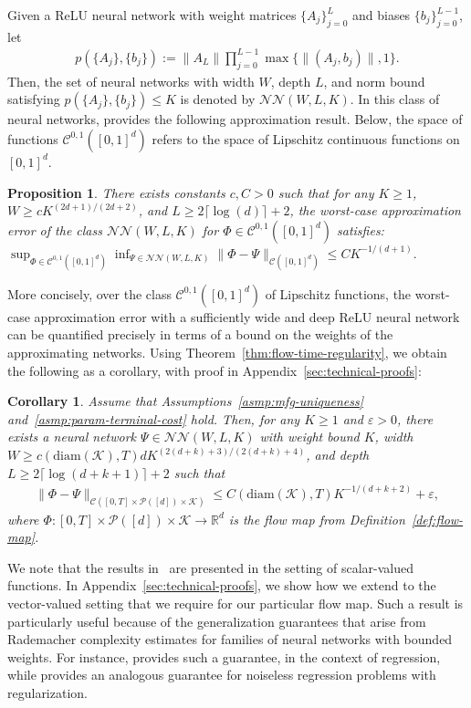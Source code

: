 \documentclass[11pt,reqno]{amsart}
\numberwithin{equation}{section}
\theoremstyle{plain}
\newtheorem{proposition}[theorem]{Proposition}
\newtheorem{corollary}[theorem]{Corollary}
\newcommand{\R}{\mathbb{R}}
\newcommand{\calC}{{\mathcal C}}
\newcommand{\calK}{{\mathcal K}}
\newcommand{\calP}{{\mathcal P}}
\newcommand{\NN}{{\mathcal N \mathcal N}}
\newcommand{\1}{\boldsymbol{\mathbbm{1}}}
\begin{document}
Given a ReLU neural network with weight matrices $\{A_j\}_{j=0}^{L}$ and biases $\{b_j\}_{j=0}^{L-1}$, let 
\begin{align*}
    p(\{A_j\}, \{b_{j}\}) := \|A_L\| \prod_{j=0}^{L - 1} \max\{\|(A_j, b_j)\|, 1\}.
\end{align*}
Then, the set of neural networks with width $W$, depth $L$, and norm bound satisfying $p(\{A_j\}, \{b_j\}) \leq K$ is denoted by $\NN(W, L, K)$. In this class of neural networks, \cite[Theorem 3.2]{Jiao2023} provides the following approximation result. Below, the space of functions $\calC^{0, 1}([0,1]^d)$ refers to the space of Lipschitz continuous functions on $[0,1]^d$.
\begin{proposition}
\label{prop:jiao-approx-bound}
There exists constants $c, C > 0$ such that for any $K \geq 1$, $W \geq c K^{(2d+1) / (2d+2)}$, and $L \geq 2 \lceil \log(d)\rceil + 2$, the worst-case approximation error of the class $\NN(W, L, K)$ for $\Phi \in \calC^{0, 1}([0,1]^d)$ satisfies:
$
    \sup_{\Phi \in \calC^{0, 1}([0,1]^d)} \inf_{\Psi \in \NN(W, L, K)} \|\Phi - \Psi\|_{\calC([0,1]^d)} \leq C K^{-1/(d + 1)}.
$
\end{proposition}
More concisely, over the class $\calC^{0, 1}([0,1]^d)$ of Lipschitz functions, the worst-case approximation error with a sufficiently wide and deep ReLU neural network can be quantified precisely in terms of a bound on the weights of the approximating networks. Using Theorem~\ref{thm:flow-time-regularity}, we obtain the following as a corollary, with proof in Appendix~\ref{sec:technical-proofs}:
\begin{corollary}
\label{cor:appx-flow-map}
Assume that Assumptions~\ref{asmp:mfg-uniqueness} and~\ref{asmp:param-terminal-cost} hold. Then, for any $K \geq 1$ and $\varepsilon > 0$, there exists a neural network $\Psi \in \NN(W, L, K)$ with weight bound $K$, width $W \geq c(\mathrm{diam}(\calK), T) d K^{(2(d + k) + 3)/(2(d + k) + 4)}$, and depth $L \geq 2 \lceil \log(d + k + 1)\rceil + 2$ such that
\begin{align*}
    \|\Phi - \Psi\|_{\calC([0, T] \times \calP([d]) \times \calK)} \leq C(\mathrm{diam}(\calK), T) K^{-1/(d + k + 2)} + \varepsilon,
\end{align*}
where $\Phi : [0, T] \times \calP([d]) \times \calK \to \R^d$ is the flow map from Definition~\ref{def:flow-map}.
\end{corollary}
We note that the results in~\cite{Jiao2023} are presented in the setting of scalar-valued functions. In Appendix~\ref{sec:technical-proofs}, we show how we extend to the vector-valued setting that we require for our particular flow map.
Such a result is particularly useful because of the generalization guarantees that arise from Rademacher complexity estimates for families of neural networks with bounded weights. For instance, \cite[Theorem 4.1]{Jiao2023} provides such a guarantee, in the context of regression, while \cite[Corollary 4.2]{Jiao2023} provides an analogous guarantee for noiseless regression problems with regularization.
\end{document}
